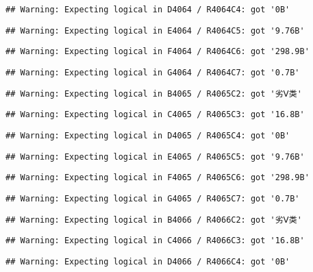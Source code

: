 \documentclass[
]{article}
\begin{document}
\begin{verbatim}
## Warning: Expecting logical in D4064 / R4064C4: got '0B'
\end{verbatim}

\begin{verbatim}
## Warning: Expecting logical in E4064 / R4064C5: got '9.76B'
\end{verbatim}

\begin{verbatim}
## Warning: Expecting logical in F4064 / R4064C6: got '298.9B'
\end{verbatim}

\begin{verbatim}
## Warning: Expecting logical in G4064 / R4064C7: got '0.7B'
\end{verbatim}

\begin{verbatim}
## Warning: Expecting logical in B4065 / R4065C2: got '劣Ⅴ类'
\end{verbatim}

\begin{verbatim}
## Warning: Expecting logical in C4065 / R4065C3: got '16.8B'
\end{verbatim}

\begin{verbatim}
## Warning: Expecting logical in D4065 / R4065C4: got '0B'
\end{verbatim}

\begin{verbatim}
## Warning: Expecting logical in E4065 / R4065C5: got '9.76B'
\end{verbatim}

\begin{verbatim}
## Warning: Expecting logical in F4065 / R4065C6: got '298.9B'
\end{verbatim}

\begin{verbatim}
## Warning: Expecting logical in G4065 / R4065C7: got '0.7B'
\end{verbatim}

\begin{verbatim}
## Warning: Expecting logical in B4066 / R4066C2: got '劣Ⅴ类'
\end{verbatim}

\begin{verbatim}
## Warning: Expecting logical in C4066 / R4066C3: got '16.8B'
\end{verbatim}

\begin{verbatim}
## Warning: Expecting logical in D4066 / R4066C4: got '0B'
\end{verbatim}
\end{document}
